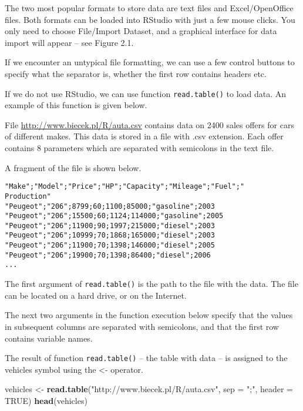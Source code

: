 \documentclass[]{book}
\newenvironment{Shaded}{\begin{snugshade}}{\end{snugshade}}
\newcommand{\KeywordTok}[1]{\textcolor[rgb]{0.13,0.29,0.53}{\textbf{#1}}}
\newcommand{\DataTypeTok}[1]{\textcolor[rgb]{0.13,0.29,0.53}{#1}}
\newcommand{\StringTok}[1]{\textcolor[rgb]{0.31,0.60,0.02}{#1}}
\newcommand{\OtherTok}[1]{\textcolor[rgb]{0.56,0.35,0.01}{#1}}
\newcommand{\NormalTok}[1]{#1}
\theoremstyle{definition}
\theoremstyle{definition}
\theoremstyle{definition}
\theoremstyle{remark}
\begin{document}
The two most popular formats to store data are text files and
Excel/OpenOffice files. Both formats can be loaded into RStudio with
just a few mouse clicks. You only need to choose File/Import Dataset,
and a graphical interface for data import will appear -- see Figure 2.1.

If we encounter an untypical file formatting, we can use a few control
buttons to specify what the separator is, whether the first row contains
headers etc.

If we do not use RStudio, we can use function \texttt{read.table()} to
load data. An example of this function is given below.

File \url{http://www.biecek.pl/R/auta.csv} contains data on 2400 sales
offers for cars of different makes. This data is stored in a file with
.csv extension. Each offer contains 8 parameters which are separated
with semicolons in the text file.

A fragment of the file is shown below.

\begin{verbatim}
"Make";"Model";"Price";"HP";"Capacity";"Mileage";"Fuel";"
Production"
"Peugeot";"206";8799;60;1100;85000;"gasoline";2003
"Peugeot";"206";15500;60;1124;114000;"gasoline";2005
"Peugeot";"206";11900;90;1997;215000;"diesel";2003
"Peugeot";"206";10999;70;1868;165000;"diesel";2003
"Peugeot";"206";11900;70;1398;146000;"diesel";2005
"Peugeot";"206";19900;70;1398;86400;"diesel";2006
...
\end{verbatim}

The first argument of \texttt{read.table()} is the path to the file with
the data. The file can be located on a hard drive, or on the Internet.

The next two arguments in the function execution below specify that the
values in subsequent columns are separated with semicolons, and that the
first row contains variable names.

The result of function \texttt{read.table()} -- the table with data --
is assigned to the vehicles symbol using the \textless{}- operator.

\begin{Shaded}
\begin{Highlighting}[]
\NormalTok{vehicles <-}\StringTok{ }\KeywordTok{read.table}\NormalTok{(}\StringTok{"http://www.biecek.pl/R/auta.csv"}\NormalTok{,}
                       \DataTypeTok{sep =} \StringTok{";"}\NormalTok{, }\DataTypeTok{header =} \OtherTok{TRUE}\NormalTok{)}
\KeywordTok{head}\NormalTok{(vehicles)}
\end{Highlighting}
\end{Shaded}
\end{document}

